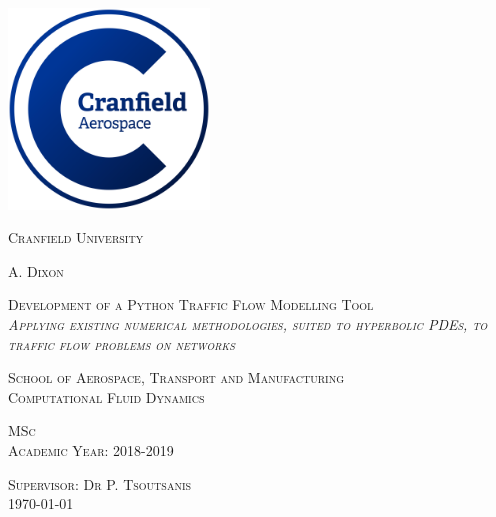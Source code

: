 



\thispagestyle{empty}

\begin{center}

\includegraphics[trim=0 0 0 0,clip,width=0.4\textwidth]{cranfield.jpg}

\vfill

\LARGE \textsc{Cranfield University}

\vfill

\LARGE \textsc{A. Dixon}

\vfill

\Huge\textsc{Development of a Python Traffic Flow Modelling Tool}\\
\vspace{0.5cm}
\large\textsc{\emph{Applying existing numerical methodologies, suited to hyperbolic PDEs, to traffic flow problems on networks}}

\vfill

\large\textsc{School of Aerospace, Transport and Manufacturing}\\
\large\textsc{Computational Fluid Dynamics}

\vfill

\large\textsc{MSc}\\
\large\textsc{Academic Year: 2018-2019}\\

\vfill

\large\textsc{Supervisor: Dr P. Tsoutsanis}\\
\large\textsc{\monthyeardate\today}

\end{center} \normalsize

\pagebreak

\thispagestyle{empty}

\mbox

\pagebreak




